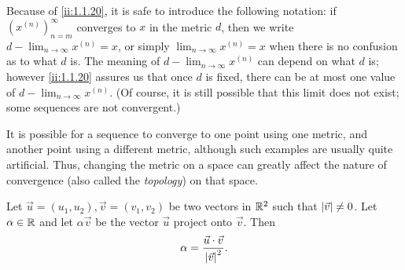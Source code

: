 \begin{note}
  Because of \cref{ii:1.1.20}, it is safe to introduce the following notation:
  if \((x^{(n)})_{n = m}^\infty\) converges to \(x\) in the metric \(d\), then we write \(d - \lim_{n \to \infty} x^{(n)} = x\), or simply \(\lim_{n \to \infty} x^{(n)} = x\) when there is no confusion as to what \(d\) is.
  The meaning of \(d - \lim_{n \to \infty} x^{(n)}\) can depend on what \(d\) is;
  however \cref{ii:1.1.20} assures us that once \(d\) is fixed, there can be at most one value of \(d - \lim_{n \to \infty} x^{(n)}\).
  (Of course, it is still possible that this limit does not exist;
  some sequences are not convergent.)
\end{note}

\begin{rmk}\label{ii:1.1.21}
  It is possible for a sequence to converge to one point using one metric, and another point using a different metric, although such examples are usually quite artificial.
  Thus, changing the metric on a space can greatly affect the nature of convergence (also called the \emph{topology}) on that space.
\end{rmk}

\begin{ac}\label{ii:ac:1.1.1}
  Let \(\vec{u} = (u_1, u_2), \vec{v} = (v_1, v_2)\) be two vectors in \(\mathbb{R}^2\) such that \(\left\lvert\vec{v}\right\rvert \neq 0\).
  Let \(\alpha \in \mathbb{R}\) and let \(\alpha \vec{v}\) be the vector \(\vec{u}\) project onto \(\vec{v}\).
  Then
  \[
    \alpha = \dfrac{\vec{u} \cdot \vec{v}}{\left\lvert\vec{v}\right\rvert^2}.
  \]
\end{ac}

